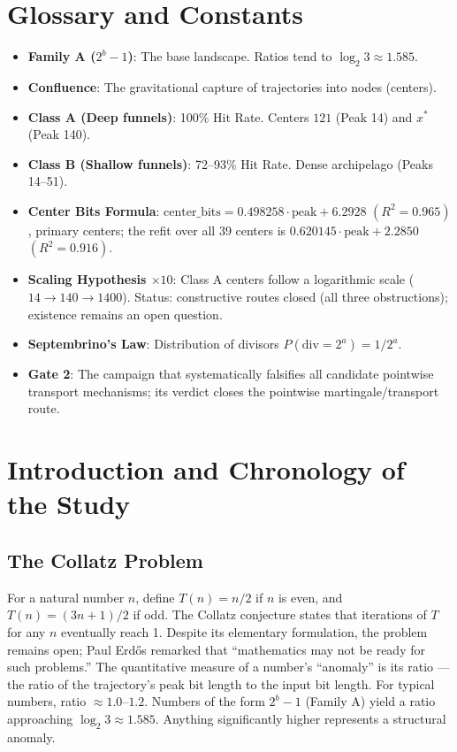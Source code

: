 \documentclass[12pt,a4paper]{article}
\theoremstyle{remark}
\begin{document}
\section*{Glossary and Constants}
\begin{itemize}
\item \textbf{Family A ($2^b - 1$)}: The base landscape. Ratios tend to $\log_2 3 \approx 1.585$.
\item \textbf{Confluence}: The gravitational capture of trajectories into nodes (centers).
\item \textbf{Class A (Deep funnels)}: 100\% Hit Rate. Centers $121$ (Peak 14) and $x^*$ (Peak 140).
\item \textbf{Class B (Shallow funnels)}: 72--93\% Hit Rate. Dense archipelago (Peaks 14--51).
\item \textbf{Center Bits Formula}: $\mathrm{center\_bits} = 0.498258 \cdot \mathrm{peak} + 6.2928$ $(R^2 = 0.965)$, primary centers; the refit over all 39 centers is $0.620145 \cdot \mathrm{peak} + 2.2850$ $(R^2=0.916)$.
\item \textbf{Scaling Hypothesis $\times 10$}: Class A centers follow a logarithmic scale ($14 \to 140 \to 1400$). Status: constructive routes closed (all three obstructions); existence remains an open question.
\item \textbf{Septembrino's Law}: Distribution of divisors $P(\mathrm{div} = 2^a) = 1/2^a$.
\item \textbf{Gate 2}: The campaign that systematically falsifies all candidate pointwise transport mechanisms; its verdict closes the pointwise martingale/transport route.
\end{itemize}

\section{Introduction and Chronology of the Study}
\subsection{The Collatz Problem}
For a natural number $n$, define $T(n) = n/2$ if $n$ is even, and $T(n) = (3n+1)/2$ if odd. The Collatz conjecture states that iterations of $T$ for any $n$ eventually reach 1. Despite its elementary formulation, the problem remains open; Paul Erd\H{o}s remarked that ``mathematics may not be ready for such problems.''
The quantitative measure of a number's ``anomaly'' is its ratio --- the ratio of the trajectory's peak bit length to the input bit length. For typical numbers, ratio $\approx 1.0$--$1.2$. Numbers of the form $2^b - 1$ (Family A) yield a ratio approaching $\log_2 3 \approx 1.585$. Anything significantly higher represents a structural anomaly.
\end{document}
